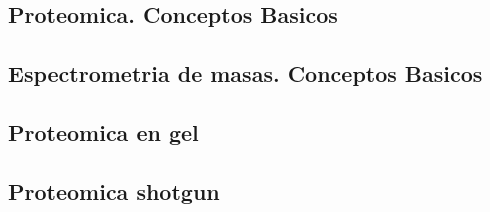 %


\chapter{}





\section{Proteomica. Conceptos Basicos}



\section{Espectrometria de masas. Conceptos Basicos}



\section{Proteomica en gel}



\section{Proteomica shotgun}



